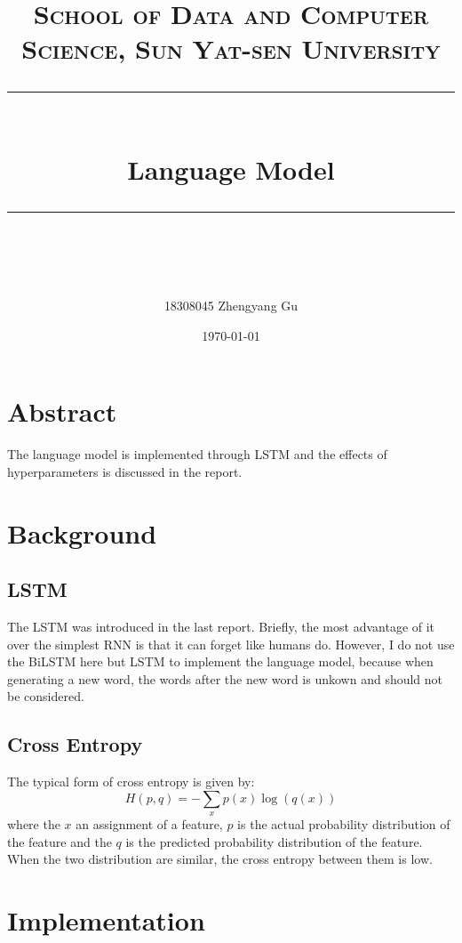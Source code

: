 \documentclass[UTF8, a4paper, 11pt]{article}
\title{	
\normalfont \normalsize
\textsc{School of Data and Computer Science, Sun Yat-sen University} \\ [25pt] %
\rule{\textwidth}{0.5pt} \\[0.4cm] %
\huge  Language Model\\ %
\rule{\textwidth}{2pt} \\[0.5cm] %
\author{18308045 Zhengyang Gu}
\date{\normalsize\today}
}
\begin{document}
\maketitle
\tableofcontents
\newpage

\section{Abstract}
The language model is implemented through LSTM and the effects of hyperparameters is discussed in the report.

\section{Background}
\subsection{LSTM}
The LSTM was introduced in the last report.
Briefly, the most advantage of it over the simplest RNN is that it can forget like humans do.
However, I do not use the BiLSTM here but LSTM to implement the language model,
because when generating a new word, the words after the new word is unkown and should not be considered.
\subsection{Cross Entropy}
The typical form of cross entropy is given by:
$$H(p,q)=-\sum_x p(x) \log(q(x))$$
where the $x$ an assignment of a feature,
$p$ is the actual probability distribution of the feature and the $q$ is the predicted probability distribution of the feature.
When the two distribution are similar, the cross entropy between them is low.

\section{Implementation}
\end{document}
